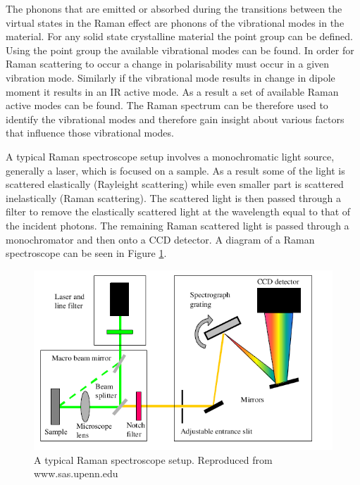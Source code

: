 The phonons that are emitted or absorbed during the transitions between the virtual states in the Raman effect are phonons of the vibrational modes in the material. For any solid state crystalline material the point group can be defined. Using the point group the available vibrational modes can be found. In order for Raman scattering to occur a change in polarisability must occur in a given vibration mode. Similarly if the vibrational mode results in change in dipole moment it results in an IR active mode. As a result a set of available Raman active modes can be found. The Raman spectrum can be therefore used to identify the vibrational modes and therefore gain insight about various factors that influence those vibrational modes.

A typical Raman spectroscope setup involves a monochromatic light source, generally a laser, which is focused on a sample. As a result some of the light is scattered elastically (Rayleight scattering) while even smaller part is scattered inelastically (Raman scattering). The scattered light is then passed through a filter to remove the elastically scattered light at the wavelength equal to that of the incident photons. The remaining Raman scattered light is passed through a monochromator and then onto a CCD detector. A diagram of a Raman spectroscope can be seen in Figure \ref{fig:MethodologyRamanSetup}.

\begin{figure}[!ht]
	\begin{center}
		\includegraphics[scale=0.7]{Methodology/RamanSetup.png}
		\caption{A typical Raman spectroscope setup. Reproduced from www.sas.upenn.edu}
		\label{fig:MethodologyRamanSetup}
	\end{center}
\end{figure}

